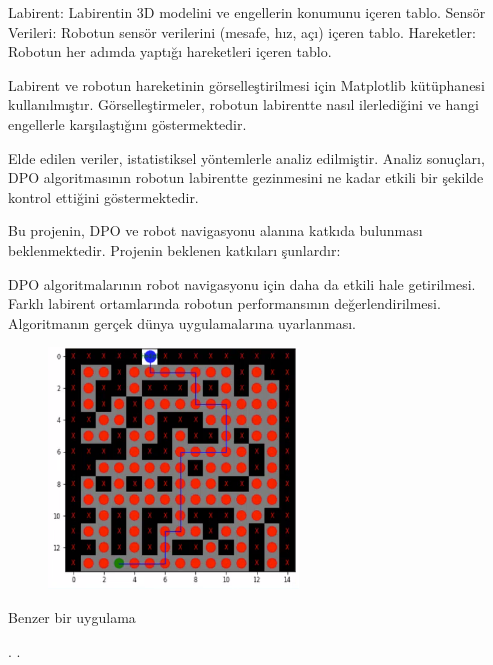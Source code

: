\documentclass[12pt, a4paper]{article}
\begin{document}
Labirent: Labirentin 3D modelini ve engellerin konumunu içeren tablo.
Sensör Verileri: Robotun sensör verilerini (mesafe, hız, açı) içeren tablo.
Hareketler: Robotun her adımda yaptığı hareketleri içeren tablo.

Labirent ve robotun hareketinin görselleştirilmesi için Matplotlib kütüphanesi kullanılmıştır. Görselleştirmeler, robotun labirentte nasıl ilerlediğini ve hangi engellerle karşılaştığını göstermektedir.

Elde edilen veriler, istatistiksel yöntemlerle analiz edilmiştir. Analiz sonuçları, DPO algoritmasının robotun labirentte gezinmesini ne kadar etkili bir şekilde kontrol ettiğini göstermektedir.

Bu projenin, DPO ve robot navigasyonu alanına katkıda bulunması beklenmektedir. Projenin beklenen katkıları şunlardır:

DPO algoritmalarının robot navigasyonu için daha da etkili hale getirilmesi.
Farklı labirent ortamlarında robotun performansının değerlendirilmesi.
Algoritmanın gerçek dünya uygulamalarına uyarlanması.

	
	\begin{figure}[h]
		\centering		
		\includegraphics{image}		
	\end{figure}  
	\centering Benzer bir uygulama	
	
	
	
	
	
	\cite{gullu2017labirentlerde}.
	\cite{boluk2019mobil}.
	\cite{kavasougluyapay}
	
		
	
	
	
	
	 
\end{document}
